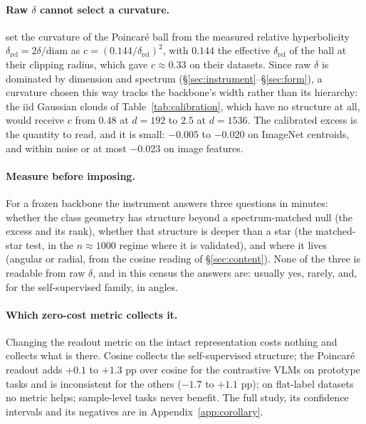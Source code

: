 \paragraph{Raw $\delta$ cannot select a curvature.} \citet{Khrulkov_2020_CVPR} set the curvature of the Poincar\'{e} ball from the measured relative hyperbolicity $\delta_{\text{rel}}=2\delta/\mathrm{diam}$ as $c=(0.144/\delta_{\text{rel}})^2$, with $0.144$ the effective $\delta_{\text{rel}}$ of the ball at their clipping radius, which gave $c\approx0.33$ on their datasets. Since raw $\delta$ is dominated by dimension and spectrum (\S\ref{sec:instrument}--\S\ref{sec:form}), a curvature chosen this way tracks the backbone's width rather than its hierarchy: the iid Gaussian clouds of Table~\ref{tab:calibration}, which have no structure at all, would receive $c$ from $0.48$ at $d{=}192$ to $2.5$ at $d{=}1536$. The calibrated excess is the quantity to read, and it is small: $-0.005$ to $-0.020$ on ImageNet centroids, and within noise or at most $-0.023$ on image features. %

\paragraph{Measure before imposing.} For a frozen backbone the instrument answers three questions in minutes: whether the class geometry has structure beyond a spectrum-matched null (the excess and its rank), whether that structure is deeper than a star (the matched-star test, in the $n\approx1000$ regime where it is validated), and where it lives (angular or radial, from the cosine reading of \S\ref{sec:content}). None of the three is readable from raw $\delta$, and in this census the answers are: usually yes, rarely, and, for the self-supervised family, in angles.

\paragraph{Which zero-cost metric collects it.} Changing the readout metric on the intact representation costs nothing and collects what is there. Cosine collects the self-supervised structure; the Poincar\'{e} readout adds $+0.1$ to $+1.3$ pp over cosine for the contrastive VLMs on prototype tasks and is inconsistent for the others ($-1.7$ to $+1.1$ pp); on flat-label datasets no metric helps; sample-level tasks never benefit. The full study, its confidence intervals and its negatives are in Appendix~\ref{app:corollary}. %

